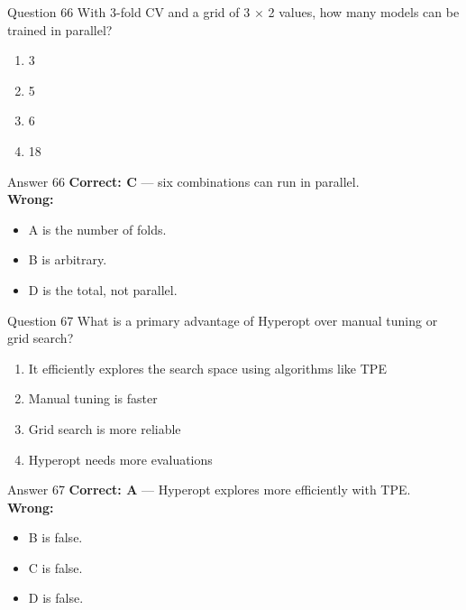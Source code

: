 \documentclass[aspectratio=169,11pt]{beamer}
\begin{document}
	\begin{frame}{Question 66}
		With 3-fold CV and a grid of 3 $\times$ 2 values, how many models can be trained in parallel?
		\begin{enumerate}[label=\Alph*.]
			\item 3
			\item 5
			\item 6
			\item 18
		\end{enumerate}
	\end{frame}
	\begin{frame}{Answer 66}
		\textbf{Correct: C} --- six combinations can run in parallel.\\
		\vspace{0.5em}
		\textbf{Wrong:}
		\begin{itemize}
			\item A is the number of folds.
			\item B is arbitrary.
			\item D is the total, not parallel.
		\end{itemize}
	\end{frame}
	
	\begin{frame}{Question 67}
		What is a primary advantage of Hyperopt over manual tuning or grid search?
		\begin{enumerate}[label=\Alph*.]
			\item It efficiently explores the search space using algorithms like TPE
			\item Manual tuning is faster
			\item Grid search is more reliable
			\item Hyperopt needs more evaluations
		\end{enumerate}
	\end{frame}
	\begin{frame}{Answer 67}
		\textbf{Correct: A} --- Hyperopt explores more efficiently with TPE.\\
		\vspace{0.5em}
		\textbf{Wrong:}
		\begin{itemize}
			\item B is false.
			\item C is false.
			\item D is false.
		\end{itemize}
	\end{frame}
	
\end{document}
